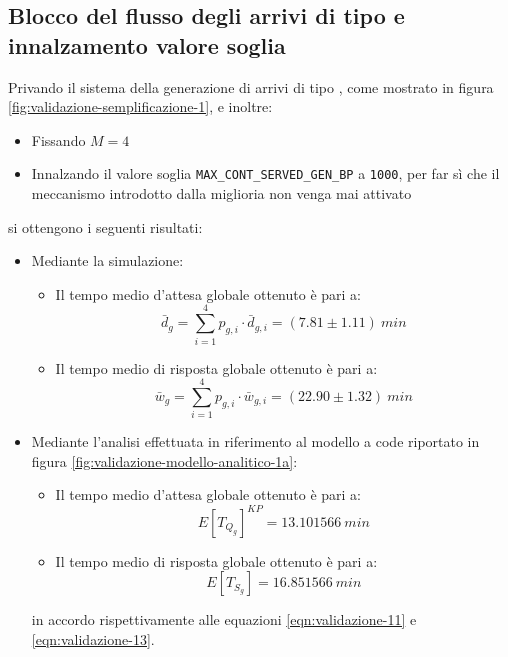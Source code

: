\subsection{Blocco del flusso degli arrivi di tipo \sr{} e innalzamento valore soglia}
Privando il sistema della generazione di arrivi di tipo \sr{}, come mostrato in figura \ref{fig:validazione-semplificazione-1}, e inoltre:
\begin{itemize}
\item Fissando $M = 4$
\item Innalzando il valore soglia \texttt{MAX\_CONT\_SERVED\_GEN\_BP} a \texttt{1000}, per far sì che il meccanismo introdotto dalla miglioria non venga mai attivato
\end{itemize}
si ottengono i seguenti risultati:
\begin{itemize}
\item Mediante la simulazione:
\begin{itemize}
\item Il tempo medio d'attesa globale ottenuto è pari a:
\begin{equation} 
\bar{d}_g = \sum_{i = 1}^4 p_{g,i}\cdot \bar{d}_{g,i} = (7.81 \pm 1.11)\ min
\end{equation}
\item Il tempo medio di risposta globale ottenuto è pari a:
\begin{equation}
\bar{w}_g = \sum_{i = 1}^4 p_{g,i}\cdot \bar{w}_{g,i} = (22.90 \pm 1.32)\ min
\end{equation}
\end{itemize}

\item Mediante l'analisi effettuata in riferimento al modello a code riportato in figura \ref{fig:validazione-modello-analitico-1a}:
\begin{itemize}
\item Il tempo medio d'attesa globale ottenuto è pari a:
\begin{equation}
E[T_{Q_g}]^{KP} = 13.101566\ min 
\end{equation}
\item Il tempo medio di risposta globale ottenuto è pari a:
\begin{equation}
E[T_{S_g}] = 16.851566\ min 
\end{equation}
\end{itemize}
in accordo rispettivamente alle equazioni \ref{eqn:validazione-11} e \ref{eqn:validazione-13}.
\end{itemize}

